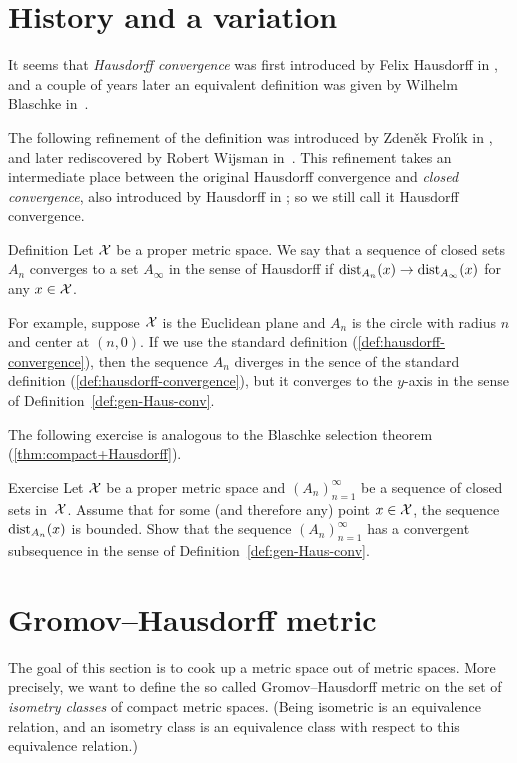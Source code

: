 \section{History and a variation}

It seems that \emph{Hausdorff convergence} was first introduced by Felix Hausdorff in \cite{hausdorff},
and a couple of years later an equivalent definition was given by Wilhelm Blaschke in~\cite{blaschke}.

The following refinement of the definition was introduced by  Zden\v{e}k Frol\'{\i}k in \cite{frolik},
and later rediscovered by Robert Wijsman in~\cite{wijsman}.  
This refinement takes an intermediate place between the original Hausdorff convergence and {}\emph{closed convergence}, also introduced by Hausdorff in \cite{hausdorff};
so we still call it Hausdorff convergence.

\begin{thm}{Definition}\label{def:gen-Haus-conv}
Let $\mathcal{X}$ be a proper metric space.
We say that a sequence of closed sets $A_n$ converges to a set $A_\infty$ in the sense of Hausdorff if $\mathrm{dist}_{A_n}(x)\to \mathrm{dist}_{A_\infty}(x)$ for any $x\in\mathcal{X}$.
\end{thm}

For example, suppose $\mathcal{X}$ is the Euclidean plane and $A_n$ is the circle with radius $n$ and center at $(n,0)$.
If we use the standard definition (\ref{def:hausdorff-convergence}), then the sequence $A_n$ diverges in the sence of the standard definition (\ref{def:hausdorff-convergence}), but it converges to the $y$-axis in the sense of Definition~\ref{def:gen-Haus-conv}.

The following exercise is analogous to the Blaschke selection theorem (\ref{thm:compact+Hausdorff}).

\begin{thm}{Exercise}
Let $\mathcal{X}$ be a proper metric space
and $(A_n)_{n=1}^\infty$ be a sequence of closed sets in~$\mathcal{X}$.
Assume that for some (and therefore any) point  $x\in\mathcal{X}$, 
the sequence $\mathrm{dist}_{A_n}(x)$ is bounded.
Show that the sequence  $(A_n)_{n=1}^\infty$ has a convergent subsequence in the sense of Definition~\ref{def:gen-Haus-conv}.
\end{thm}


\section{Gromov--Hausdorff metric}

The goal of this section is to cook up a metric space out of metric spaces.
More precisely, we want to define the so called  Gromov--Hausdorff metric on the set of \emph{isometry classes} of compact metric spaces.
(Being isometric is an equivalence relation, 
and an isometry class is an equivalence class with respect to this equivalence relation.)


